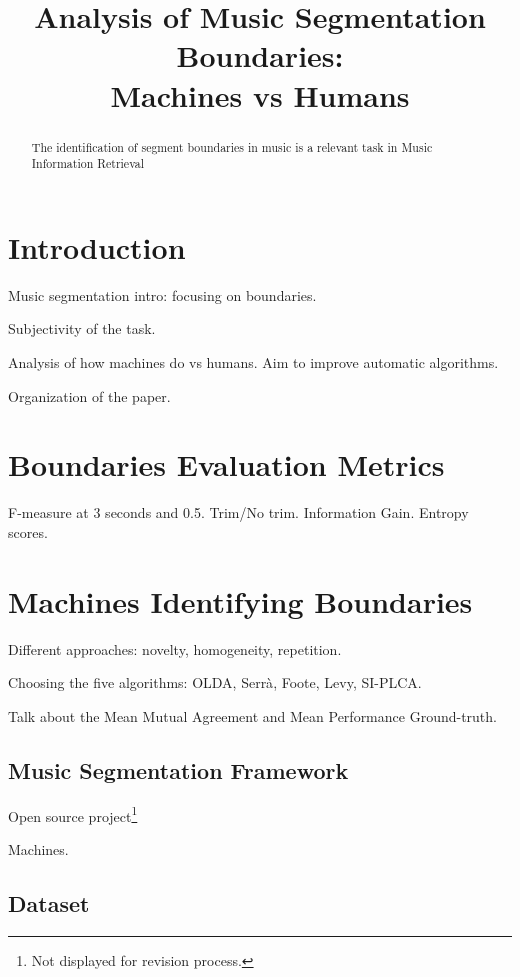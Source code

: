 \documentclass{article}
\title{Analysis of Music Segmentation Boundaries:\\ Machines vs Humans}
\begin{document}
%
\maketitle
%
\begin{abstract}
  The identification of segment boundaries in music is a relevant task in Music Information Retrieval
  
\end{abstract}
%
\section{Introduction}\label{sec:introduction}

Music segmentation intro: focusing on boundaries.

Subjectivity of the task.

Analysis of how machines do vs humans. Aim to improve automatic algorithms.

Organization of the paper.

\section{Boundaries Evaluation Metrics}

F-measure at 3 seconds and 0.5. Trim/No trim. Information Gain. Entropy scores.

\section{Machines Identifying Boundaries}\label{sec:eval_desc}

Different approaches: novelty, homogeneity, repetition.

Choosing the five algorithms: OLDA\cite{McFee2014}, Serr\`a\cite{Serra2013},
Foote\cite{Foote1999}, Levy\cite{Levy2008}, SI-PLCA\cite{Weiss2011}.

Talk about the Mean Mutual Agreement and Mean Performance Ground-truth\cite{Holzapfel2012}.

\subsection{Music Segmentation Framework}

Open source project\footnote{Not displayed for revision process.}

Machines.

\subsection{Dataset}
\end{document}
